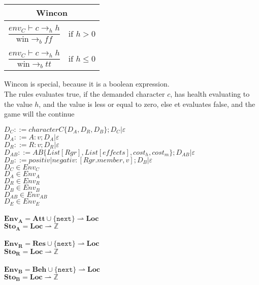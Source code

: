 \begin{center}
\begin{tabular}{ l l }
\multicolumn{2}{c}{\textbf{Wincon}}\\
\hline
 & \\
$\dfrac{env_{C} \vdash c \rightarrow_{h} h}{\text{win} \rightarrow_{b} ff}$ & $\text{if } h > 0$\\
 & \\
$\dfrac{env_{C} \vdash c \rightarrow_{h} h}{\text{win} \rightarrow_{b} tt}$ & $\text{if } h \leq 0$\\
\end{tabular}
\end{center}
Wincon is special, because it is a boolean expression. \\
The rules evaluates true, if the demanded character $c$, has health evaluating to the value $h$, and the value is less or equal to zero, else et evaluates false, and the game will the continue 
\pagebreak

	$D_C ::= character C \{ D_A, D_R, D_B \}; D_C | \varepsilon$\\
	$D_A ::= A: v; D_A | \varepsilon$\\
	$D_R ::= R: v; D_R | \varepsilon$\\
	$D_{AB} ::= AB \{ List[Rgr], List[effects], cost_h, cost_m \}; D_{AB} | \varepsilon$\\
	$D_B ::= positiv | negativ : [Rgr.member, v]; D_B | \varepsilon$\\

	
	$D_C \in Env_C$\\
	$D_A \in Env_A$\\
	$D_R \in Env_R$\\
	$D_B \in Env_B$\\
	$D_{AB} \in Env_{AB}$\\
	$D_E \in Env_E$\\
	\\
	
	$\mathbf{Env_A} = \textbf{Att} \cup \{ \texttt{next} \} \rightharpoonup \textbf{Loc}$\\
	$\mathbf{Sto_A} = \textbf{Loc} \rightharpoonup \mathbb{Z}$\\
	\\
	$\mathbf{Env_R} = \textbf{Res} \cup \{ \texttt{next} \} \rightharpoonup \textbf{Loc}$\\
	$\mathbf{Sto_R} = \textbf{Loc} \rightharpoonup \mathbb{Z}$\\
	\\
	$\mathbf{Env_B} = \textbf{Beh} \cup \{ \texttt{next} \} \rightharpoonup \textbf{Loc}$\\
	$\mathbf{Sto_B} = \textbf{Loc} \rightharpoonup \mathbb{Z}$\\
	\\
	


